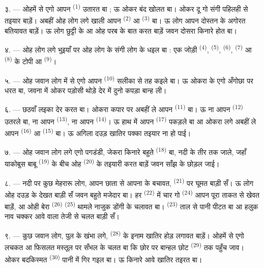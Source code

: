 ३. --- ओहमें से एगो आपन  \textsuperscript{(1)} उतारत बा ;
ऊ ओकर बंद खोलत बा। ओकर दू गो संगी पहिलही से तइयार बाड़ें। अबहीं ओह लोग
लगे खाली आपन  \textsuperscript{(2)} आ  \textsuperscript{(3)} बा। ऊ लोग आपन दोस्तन के अगोरत बतियावत
बाड़ें। ऊ लोग छुट्टी के आ ओह परब के बात करत बाड़ें जवन दोसरा किनारे
होत बा।

४. --- ओह लोग लगे भुइयाँ पर ओह लोग के संगी लोग के  धइल
बा : एक जोड़ी  \textsuperscript{(4)}, 
\textsuperscript{(5)},  \textsuperscript{(6)},
 \textsuperscript{(7)} आ 
\textsuperscript{(8)} के टोपी आ  \textsuperscript{(9)}।

५. --- ओह जवान लोग में से एगो आपन  \textsuperscript{(10)}
सलीका से तह कइले बा। ऊ ओकरा के एगो अँगोछा पर धरत बा, जवना में ओकर
पड़ोसी थोड़े देर में दुनो कपड़ा बान्ह ली।

६. --- छठवाँ लइका देर करत बा। ओकरा कपार पर अबहीं ले आपन 
\textsuperscript{(11)} बा। ऊ ना आपन  \textsuperscript{(12)}
उतरले बा, ना आपन  \textsuperscript{(13)}, ना आपन
 \textsuperscript{(14)}। ऊ हाथ में आपन 
\textsuperscript{(17)} पकड़ले बा आ ओकरा लगे अबहीं ले आपन
 \textsuperscript{(16)} आ  \textsuperscript{(15)}
बा। ऊ अगिला दउड़ खातिर पक्का तइयार ना हो पाई।

७. --- ओह जवान लोग लगे एगो पगडंडी, जेकरा किनारे बहुते  \textsuperscript{(18)} बा, नदी के तीर तक जाले, जहाँ याकोबुस बाबू
 \textsuperscript{(19)} के बीच ओह 
\textsuperscript{(20)} के तइयारी करत बाड़ें जवन साँझ के छोड़ल जाई।

\VUsaut{4.4mm}
\VUsaut{3.4mm}

८. --- नदी पर कुछ मेहरारू लोग, आपन छाता से आपना के बचावत,
 \textsuperscript{(21)} पर घूमत बाड़ी सँ। ऊ लोग ओह दउड़ के
देखत बाड़ी सँ जवन बहुते मजेदार बा। हर  \textsuperscript{(22)}
में चार गो  \textsuperscript{(24)} आपन पूरा ताकत से खेवत
बाड़ें, आ ओही बेरा  \textsuperscript{(26)} 
\textsuperscript{(25)} थामले नाजुक डोंगी के चलावत बा। 
\textsuperscript{(23)} ताल से पानी पीटत बा आ हलुक नाव चक्कर आवे वाला
तेजी से चलत बाड़ी सँ।

९. --- कुछ जवान लोग, पुल के खंभा लगे, 
\textsuperscript{(28)} के इनाम खातिर होड़ लगावत बाड़ें। ओहमें से एगो
लचकत आ फिसलत मस्तूल पर सँभल के चलत बा कि छोर पर बान्हल छोट
 \textsuperscript{(29)} तक पहुँच जाव। ओकर बदकिस्मत
 \textsuperscript{(30)} पानी में गिर गइल बा। ऊ
किनारे आवे खातिर तइरत बा।


